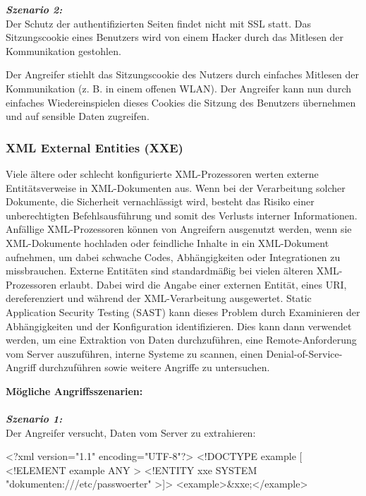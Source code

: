 \textbf{\textit{Szenario 2:}}\\

Der Schutz der authentifizierten Seiten findet nicht mit SSL statt. Das Sitzungscookie eines Benutzers wird von einem Hacker durch das Mitlesen der Kommunikation gestohlen.

Der Angreifer stiehlt das Sitzungscookie des Nutzers durch einfaches Mitlesen der Kommunikation (z. B. in einem offenen WLAN). Der Angreifer kann nun durch einfaches Wiedereinspielen dieses Cookies die Sitzung des Benutzers übernehmen und auf sensible Daten zugreifen\cite{owasp13top10}.

\subsubsection{XML External Entities (XXE)}

Viele ältere oder schlecht konfigurierte XML-Prozessoren werten externe Entitätsverweise in XML-Dokumenten aus. Wenn bei der Verarbeitung solcher Dokumente, die Sicherheit vernachlässigt wird, besteht das Risiko einer unberechtigten Befehlsausführung und somit des Verlusts interner Informationen. Anfällige XML-Prozessoren können von Angreifern ausgenutzt werden, wenn sie XML-Dokumente hochladen oder feindliche Inhalte in ein XML-Dokument aufnehmen, um dabei schwache Codes, Abhängigkeiten oder Integrationen zu missbrauchen. Externe Entitäten sind standardmäßig bei vielen älteren XML-Prozessoren erlaubt. Dabei wird die Angabe einer externen Entität, eines URI, dereferenziert und während der XML-Verarbeitung ausgewertet. Static Application Security Testing (SAST) kann dieses Problem durch Examinieren der Abhängigkeiten und der Konfiguration identifizieren. Dies kann dann verwendet werden, um eine Extraktion von Daten durchzuführen, eine Remote-Anforderung vom Server auszuführen, interne Systeme zu scannen, einen Denial-of-Service-Angriff durchzuführen sowie weitere Angriffe zu untersuchen\cite[10]{owasp17top10}.

\textbf{Mögliche Angriffsszenarien:}\\
\\
\textbf{\textit{Szenario 1:}}\\
Der Angreifer versucht, Daten vom Server zu extrahieren\cite[10]{owasp17top10}:\\

\begin{LaTeXCode}[caption={XML-Beispiel},captionpos=b, label=LaTeXCode:xxe1][numbers=none]
<?xml version="1.1" encoding="UTF-8"?>
<!DOCTYPE example [
<!ELEMENT example ANY >
<!ENTITY xxe SYSTEM "dokumenten:///etc/passwoerter" >]>
<example>\&xxe;</example>
\end{LaTeXCode}

